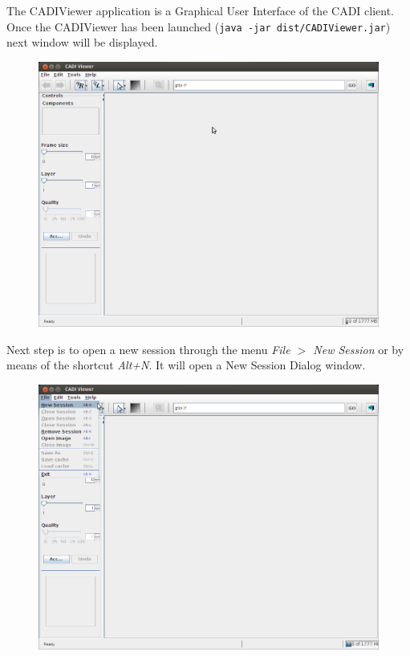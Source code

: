 \documentclass[a4paper,10pt]{article}
\begin{document}
The CADIViewer application is a Graphical User Interface of the CADI client.\\
\vspace*{0.5cm}
Once the CADIViewer has been launched ({\tt java -jar dist/CADIViewer.jar})
next window will be displayed.
\begin{figure}[!h]
	\centering
	\includegraphics[scale=0.4]{images/CADIViewer-screenshot-ini.png} \\
\end{figure}
\vspace*{0.5cm}

Next step is to open a new session through the menu \emph{File $>$ New Session}
or by means of the shortcut \emph{Alt+N}. It will open a New Session Dialog window.
\begin{figure}[!h]
	\centering
	\includegraphics[scale=0.4]{images/CADIViewer-screenshot-MenuFile.png} \\
\end{figure}
\vspace*{0.5cm}
\end{document}
